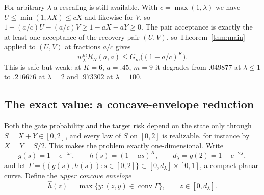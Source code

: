 \documentclass[11pt]{article}
\theoremstyle{remark}\newtheorem{remark}[theorem]{Remark}
\begin{document}
For arbitrary $\lambda$ a rescaling is still available. With $c=\max(1,\lambda)$
we have $U\le\min(1,\lambda X)\le cX$ and likewise for $V$, so
$1-(a/c)U-(a/c)V\ge1-aX-aY\ge0$. The pair acceptance is exactly the
at-least-one acceptance of the recovery pair $(U,V)$, so Theorem~\ref{thm:main}
applied to $(U,V)$ at fractions $a/c$ gives
\begin{equation}\label{eq:rescale}
w_\lambda^m R_N(a,a)\le G_m\big((1-a/c)^K\big).
\end{equation}
This is safe but weak: at $K=6$, $a=.45$, $m=9$ it degrades from $.049877$ at
$\lambda\le1$ to $.216676$ at $\lambda=2$ and $.973302$ at $\lambda=100$.

\subsection{The exact value: a concave-envelope reduction}
Both the gate probability and the target risk depend on the state only through
$S=X+Y\in[0,2]$, and every law of $S$ on $[0,2]$ is realizable, for instance by
$X=Y=S/2$. This makes the problem exactly one-dimensional. Write
\begin{equation}\label{eq:gh}
g(s)=1-e^{-\lambda s},\qquad h(s)=(1-as)^K,\qquad
d_\lambda=g(2)=1-e^{-2\lambda},
\end{equation}
and let $\Gamma=\{(g(s),h(s)):s\in[0,2]\}\subset[0,d_\lambda]\times[0,1]$, a
compact planar curve. Define the \emph{upper concave envelope}
\begin{equation}\label{eq:env}
\hat h(z)=\max\{y:(z,y)\in\operatorname{conv}\Gamma\},\qquad z\in[0,d_\lambda].
\end{equation}
\end{document}
